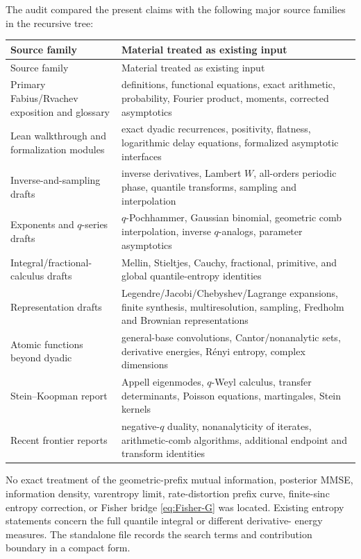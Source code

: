 \documentclass[11pt,oneside]{article}
\theoremstyle{definition}
\theoremstyle{remark}
\begin{document}
The audit compared the present claims with the following major source families in
the recursive tree:
\begin{longtable}{@{}p{}p{}@{}}
\toprule
Source family & Material treated as existing input \\
\midrule
\endfirsthead
\toprule
Source family & Material treated as existing input \\
\midrule
\endhead
Primary Fabius/Rvachev exposition and glossary & definitions, functional equations, exact arithmetic, probability, Fourier product, moments, corrected asymptotics \\
Lean walkthrough and formalization modules & exact dyadic recurrences, positivity, flatness, logarithmic delay equations, formalized asymptotic interfaces \\
Inverse-and-sampling drafts & inverse derivatives, Lambert $W$, all-orders periodic phase, quantile transforms, sampling and interpolation \\
Exponents and $q$-series drafts & $q$-Pochhammer, Gaussian binomial, geometric comb interpolation, inverse $q$-analogs, parameter asymptotics \\
Integral/fractional-calculus drafts & Mellin, Stieltjes, Cauchy, fractional, primitive, and global quantile-entropy identities \\
Representation drafts & Legendre/Jacobi/Chebyshev/Lagrange expansions, finite synthesis, multiresolution, sampling, Fredholm and Brownian representations \\
Atomic functions beyond dyadic & general-base convolutions, Cantor/nonanalytic sets, derivative energies, R\'enyi entropy, complex dimensions \\
Stein--Koopman report & Appell eigenmodes, $q$-Weyl calculus, transfer determinants, Poisson equations, martingales, Stein kernels \\
Recent frontier reports & negative-$q$ duality, nonanalyticity of iterates, arithmetic-comb algorithms, additional endpoint and transform identities \\
\bottomrule
\end{longtable}

No exact treatment of the geometric-prefix mutual information, posterior MMSE,
information density, varentropy limit, rate-distortion prefix curve, finite-sinc
entropy correction, or Fisher bridge \eqref{eq:Fisher-G} was located.  Existing
entropy statements concern the full quantile integral or different derivative-
energy measures.  The standalone file  records the search
terms and contribution boundary in a compact form.
\end{document}
